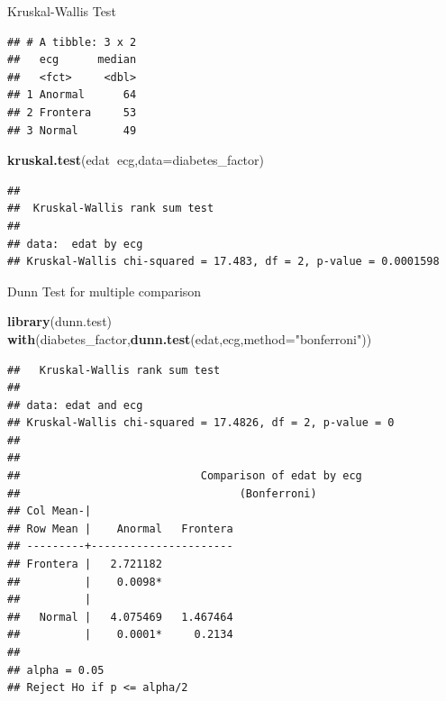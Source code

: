 \documentclass[
  ignorenonframetext,
]{beamer}
\newenvironment{Shaded}{\begin{snugshade}}{\end{snugshade}}
\newcommand{\DataTypeTok}[1]{\textcolor[rgb]{0.13,0.29,0.53}{#1}}
\newcommand{\KeywordTok}[1]{\textcolor[rgb]{0.13,0.29,0.53}{\textbf{#1}}}
\newcommand{\NormalTok}[1]{#1}
\newcommand{\OperatorTok}[1]{\textcolor[rgb]{0.81,0.36,0.00}{\textbf{#1}}}
\newcommand{\StringTok}[1]{\textcolor[rgb]{0.31,0.60,0.02}{#1}}
\begin{document}
\begin{frame}[fragile]{Kruskal-Wallis Test}
\protect\hypertarget{kruskal-wallis-test}{}

\small

\begin{Shaded}
\end{Shaded}

\begin{verbatim}
## # A tibble: 3 x 2
##   ecg      median
##   <fct>     <dbl>
## 1 Anormal      64
## 2 Frontera     53
## 3 Normal       49
\end{verbatim}

\begin{Shaded}
\begin{Highlighting}[]
\KeywordTok{kruskal.test}\NormalTok{(edat}\OperatorTok{~}\NormalTok{ecg,}\DataTypeTok{data=}\NormalTok{diabetes_factor)}
\end{Highlighting}
\end{Shaded}

\begin{verbatim}
## 
##  Kruskal-Wallis rank sum test
## 
## data:  edat by ecg
## Kruskal-Wallis chi-squared = 17.483, df = 2, p-value = 0.0001598
\end{verbatim}

\end{frame}

\begin{frame}[fragile]{Dunn Test for multiple comparison}
\protect\hypertarget{dunn-test-for-multiple-comparison}{}

\small

\begin{Shaded}
\begin{Highlighting}[]
\KeywordTok{library}\NormalTok{(dunn.test)}
\KeywordTok{with}\NormalTok{(diabetes_factor,}\KeywordTok{dunn.test}\NormalTok{(edat,ecg,}\DataTypeTok{method=}\StringTok{"bonferroni"}\NormalTok{))}
\end{Highlighting}
\end{Shaded}

\begin{verbatim}
##   Kruskal-Wallis rank sum test
## 
## data: edat and ecg
## Kruskal-Wallis chi-squared = 17.4826, df = 2, p-value = 0
## 
## 
##                            Comparison of edat by ecg                           
##                                  (Bonferroni)                                  
## Col Mean-|
## Row Mean |    Anormal   Frontera
## ---------+----------------------
## Frontera |   2.721182
##          |    0.0098*
##          |
##   Normal |   4.075469   1.467464
##          |    0.0001*     0.2134
## 
## alpha = 0.05
## Reject Ho if p <= alpha/2
\end{verbatim}

\end{frame}
\end{document}

